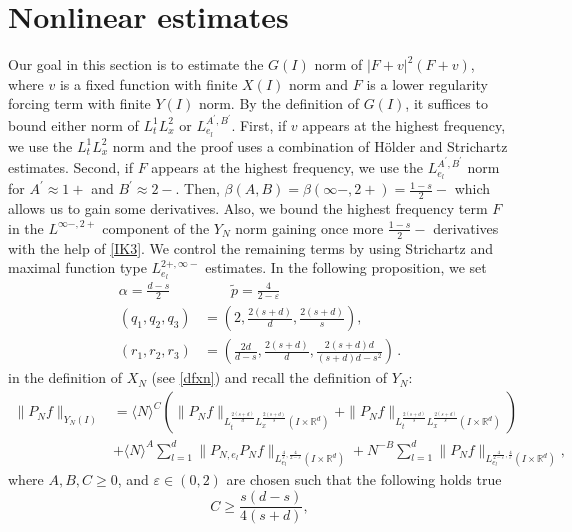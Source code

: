 \documentclass[10pt,leqno]{amsart}
\newcommand{\R}{\mathbb{R}} %
\numberwithin{equation}{section}
\begin{document}
\section{Nonlinear estimates}\label{sec:nonlin}
Our goal in this section is to estimate the $G (I)$ norm of $|F+v|^2 (F+v)$, where $v$ is a fixed function 
with finite $X(I)$ norm and $F$ is a lower regularity forcing term with finite $Y(I)$ norm. By  the definition of $G(I)$, it suffices to
bound either norm of $L^1_t L^2_x$ or $L_{e_l}^{A^\prime,B^\prime}$. 
First, if $v$ appears at the 
highest frequency, we  use the $L^1_t L^2_x$ norm and the proof uses a combination of H\" older and Strichartz estimates. Second, if $F$ appears at the highest frequency, 
we  use the $L_{e_l}^{A^\prime,B^\prime}$ norm for $A^\prime\approx 1+$ and $B^\prime\approx 2-$. Then, 
$\beta (A,B)=\beta (\infty- , 2+)= \frac{1-s}{2}-$ which allows us to  gain some derivatives. Also, we bound the highest frequency term $F$ in the $L^{\infty- ,2+}$ component of the $Y_N$ norm 
gaining once more $ \frac{1-s}{2}-$ derivatives with the help of \eqref{IK3}. We control the remaining terms by using Strichartz and maximal function type $L_{e_l}^{2+,\infty-}$ estimates. 
In the following proposition, we set 
\begin{equation}\label{parms}
\begin{aligned}
\alpha = \frac{d - s}{2} &\qquad \tilde{p} = \frac{4}{2 - \varepsilon} \\
(q_1, q_2, q_3) &= \left(2, \frac{2(s+d)}{d}, \frac{2(s+d)}{s}\right), \\
 (r_1, r_2, r_3) &= \left(\frac{2d}{d-s}, \frac{2(s+d)}{d}, \frac{2(s+d)d}{(s+d)d - s^2}\right) \,.
\end{aligned}
\end{equation}
in the definition of  $X_N$ (see \eqref{dfxn})
and recall the definition of $Y_N$: 
\begin{align*}
\|P_N f\|_{Y_N(I)}&= \langle N\rangle^C \left(\|P_N f\|_{L_t^{\frac{2(s+d)}{d}} L_x^{\frac{2(s+d)}{s}} (I\times \R^d)} +\|P_N f\|_{L_t^{\frac{2(s+d)}{s}} L_x^{\frac{2(s+d)}{s}}(I\times \R^d) } \right)\\
&+\langle N\rangle^A \sum_{l=1}^d \|P_{N,e_l} P_N f \|_{L^{\frac{4}{\varepsilon},\frac{4}{2-\varepsilon}}_{e_l}(I\times \R^d) } +N^{-B} \sum_{l=1}^d \|P_N f\|_{L^{\frac{4}{2-\varepsilon},\frac{4}{\varepsilon}}_{e_l} (I\times \R^d) },  
\end{align*}
where $A, B, C \geq 0$, and $\varepsilon \in (0, 2)$ are chosen such that the following holds true
\begin{equation}\label{recc}
C \geq \frac{s(d-s)}{4(s+d)},
\end{equation} 
\end{document}
